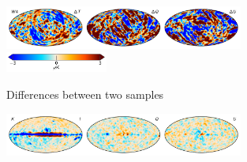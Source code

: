 \documentclass[twocolumn]{../../common/aa}
\begin{document}
\begin{figure}
	\includegraphics[width=0.7\textwidth]{figures/090-WMAP_W4_sampdiff.pdf}\\
	\includegraphics[width=0.30\textwidth]{figures/cbar_3uK.pdf}
	\caption{Differences between two samples}
        \label{fig:sampdiff}
\end{figure}
\begin{figure}
	\centering
	\includegraphics[width=0.7\textwidth]{figures/res_K_IQU.pdf}\\

\end{figure}
\end{document}
